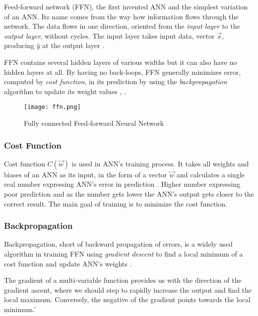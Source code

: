Feed-forward network (FFN), the first invented ANN and the simplest variation of an ANN. Its name comes from the way how information flows through the network. The data flows in one direction, oriented from the \textit{input layer} to the \textit{output layer}, without cycles. The input layer takes input data, vector $\vec{x}$, producing $\hat{y}$ at the output layer \cite{ffnbrilliant}.

FFN contains several hidden layers of various widths but it can also have no hidden layers at all. By having no back-loops, FFN generally minimizes error, computed by \textit{cost function}, in its prediction by using the \textit{backpropagation} algorithm to update its weight values \cite{mainTypesANN}, \cite{lipton2015critical}.

\begin{figure}[h]
    \centering
    \texttt{[image: ffn.png]}
    \caption{Fully connected Feed-forward Neural Network \cite{matous}}
    \label{fig:ffn}
\end{figure}


\subsubsection{Cost Function}
Cost function $C(\vec{w})$ is used in ANN's training process. It takes all weights and biases of an ANN as its input, in the form of a vector $\vec{w}$ and calculates a single real number expressing ANN's error in prediction \cite{Goodfellow-et-al-2016}. Higher number expressing poor prediction and as the number gets lower the ANN's output gets closer to the correct result. The main goal of training is to minimize the cost function. 

\subsubsection{Backpropagation}
Backpropagation, short of backward propagation of errors, is a widely used algorithm in training FFN using \textit{gradient descent} to find a local minimum of a cost function and update ANN's weights \cite{birlliantbackprop}.

The gradient of a multi-variable function provides us with the direction of the gradient ascent, where we should step to rapidly increase the output and find the local maximum. Conversely, the negative of the gradient points towards the local minimum.'

